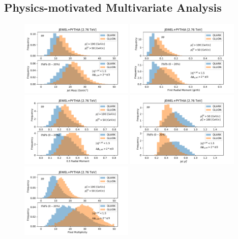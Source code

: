 \documentclass[notoc]{JHEP3}
\begin{document}
\subsection{Physics-motivated Multivariate Analysis}
\label{sec:mva}

\begin{figure}[h]
	   \centering
	   \includegraphics[width=0.48\textwidth]{plots/JEWEL_pp_pbpb020_jetMass}
	   \includegraphics[width=0.48\textwidth]{plots/JEWEL_pp_pbpb020_firstRadialMoment}
	   \includegraphics[width=0.48\textwidth]{plots/JEWEL_pp_pbpb020_halfRadialMoment}
	   \includegraphics[width=0.48\textwidth]{plots/JEWEL_pp_pbpb020_pTD}
	   \includegraphics[width=0.48\textwidth]{plots/JEWEL_pp_pbpb020_NumberjetConstituents}

\end{figure}
\end{document}
